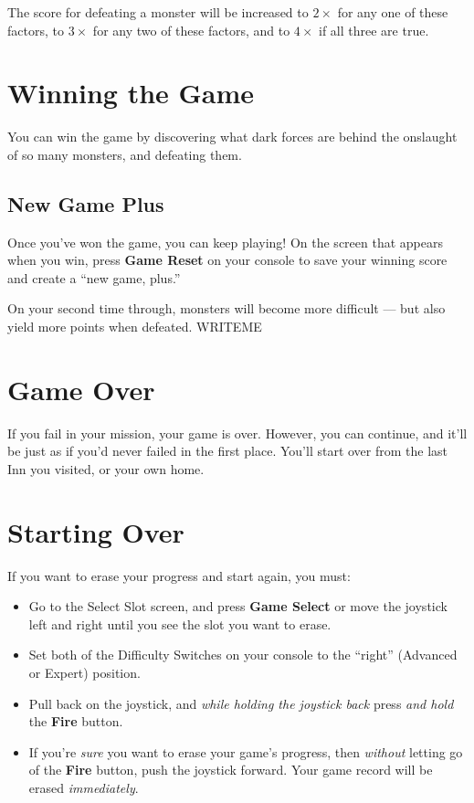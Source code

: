 \documentclass[10pt,twocolumn,openany,article]{memoir}
\begin{document}
The score for  defeating a monster will be increased  to $2\times$ for any
one of these  factors, to $3\times$ for  any two of these  factors, and to
$4\times$ if all three are true.

\section{Winning the Game}

You can  win the  game by  discovering what dark  forces are  behind the
onslaught of so many monsters, and defeating them.

\subsection*{New Game Plus}\label{sec:NewGamePlus}

Once  you've won  the game,  you can  keep playing!  On the  screen that
appears when you win, press \textbf{Game  Reset} on your console to save
your winning score and create a ``new game, plus.''

On your second  time through, monsters will become more  difficult — but
also yield more points when defeated. WRITEME

\section{Game Over}

If  you fail  in  your mission,  your  game is  over.  However, you  can
continue, and it'll be just as if you'd never failed in the first place.
You'll start over from the last Inn you visited, or your own home.

\section{Starting Over}\label{Starting Your Adventure Over}

If you want to erase your progress and start again, you must:

\begin{itemize}
\item Go  to the Select Slot  screen, and press \textbf{Game  Select} or
  move  the joystick  left and  right until  you see  the slot  you want
  to erase.
\item Set both  of the Difficulty Switches on your  console to the ``right''
  (Advanced or Expert) position.
\item Pull  back on the  joystick, and \emph{while holding  the joystick
    back} press \emph{and hold} the \textbf{Fire} button.
\item If you're \emph{sure} you want to erase your game's progress, then
  \emph{without}  letting  go  of  the \textbf{Fire}  button,  push  the
  joystick  forward. \ifdefined\DEMO  Your  game record  will be  erased
  \emph{immediately}. \fi
\end{itemize}
\end{document}
